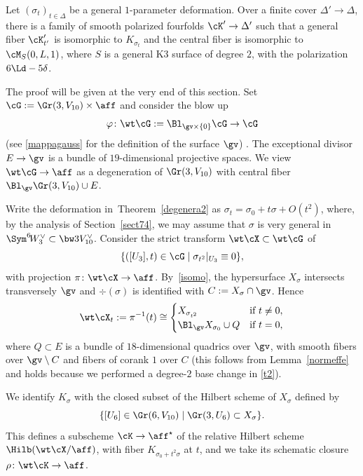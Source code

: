 \begin{theo}\label{degenera2}
Let $(\sigma_t)_{t\in \Delta}$ be a general $1$-parameter deformation.
Over a finite cover $\Delta'\to \Delta$, there is a family of smooth polarized \hk fourfolds
$\cK'\to \Delta'$ such that a general fiber
$\cK'_{t'}$ is isomorphic to $K_{\sigma_t}$ and the central fiber
is isomorphic to
$\cM_S(0,L,1)$, where $S$ is a general K3 surface of degree $2$, with the polarization $6\Ld-5\delta$.
\end{theo}

The proof will be given at the very end of this section. Set $\cG:= \Gr(3,V_{10})\times\aff$ and consider the blow up \[
\varphi\colon\wt\cG:=\Bl_{ \gv \times\{0\}} \cG \to \cG
\]
(see \eqref{mappagauss} for the definition of the surface $\gv$)
. The exceptional divisor $E\to \gv$ is a bundle of $19$-dimensional projective spaces. We view $\wt\cG\to\aff$ as a degeneration of $\Gr(3,V_{10})$ with central fiber
$\Bl_{\gv}\Gr(3,V_{10}) \cup E$.

Write the deformation in~Theorem~\ref{degenera2} as $\sigma_t=\sigma_0+t\sigma+O(t^2)$, where, by the analysis of Section~\ref{sect74}, we may assume that $\sigma$ is very general in $\Sym^6 \!W_3^{\vee}\subset \bw3 V_{10}^{\vee}$. Consider the strict transform $\wt\cX\subset \wt\cG$ of\vspace*{-3pt}
\begin{equation}\label{t2}
\{([U_3],t)\in \cG\mid \sigma_{t^2}\vert_{U_3}\equiv 0\},
\end{equation}
with projection $\pi\colon \wt\cX\to \aff$. By~\eqref{isomo}, the hypersurface $X_{\sigma}$ intersects transversely $\gv$ and $\div(\sigma)$ is identified with $C:=X_{\sigma}\cap \gv$. Hence
\[
\wt\cX_t:=\pi^{-1}(t)\cong
\begin{cases}
X_{\sigma_{t^2}} & \text{if $t\ne0$,} \\
\Bl_{\gv} X_{\sigma_0} \cup Q & \text{if $t=0$,}
\end{cases}
\]
where $Q\subset E$ is a bundle of $18$-dimensional quadrics over $\gv$, with smooth fibers over $\gv\setminus C$ and fibers of corank $1$ over $C$ (this follows from Lemma~\ref{normeffe} and holds because we performed a degree-$2$ base change in \eqref{t2}).

We identify $K_{\sigma}$ with the closed subset of the Hilbert scheme of $X_{\sigma}$ defined by
\[
\{ [U_6]\in\Gr(6,V_{10})\mid\Gr(3,U_6)\subset X_{\sigma}
\}.
\]
This defines a subscheme $\cK\to \aff^\star $ of the relative Hilbert scheme $\Hilb(\wt\cX/\aff)$, with fiber $K_{\sigma_0+t^2\sigma}$ at $t$, and we take
its schematic closure $\rho\colon \wt\cK\to\aff$.

